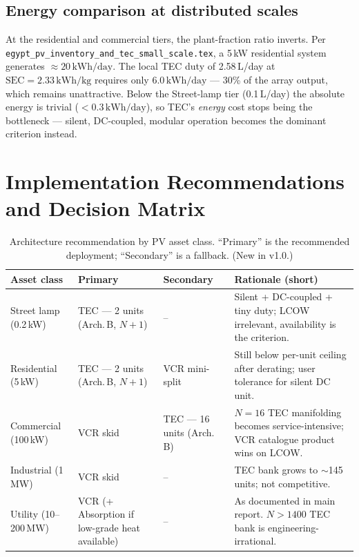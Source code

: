 \documentclass[11pt,a4paper]{article}
\newcommand{\SI}[2]{#1\,\ensuremath{\mathrm{#2}}}
\providecommand{\kilowatt}{kW}
\providecommand{\hour}{h}
\providecommand{\day}{day}
\providecommand{\kilogram}{kg}
\begin{document}
\subsection{Energy comparison at distributed scales}
At the residential and commercial tiers, the plant-fraction ratio inverts. Per \texttt{egypt\_pv\_inventory\_and\_tec\_small\_scale.tex}, a 5\,kW residential system generates $\approx\SI{20}{\kilowatt\hour/\day}$. The local TEC duty of 2.58\,L/day at $\mathrm{SEC}{=}\SI{2.33}{\kilowatt\hour/\kilogram}$ requires only $\SI{6.0}{\kilowatt\hour/\day}$ --- 30\% of the array output, which remains unattractive. Below the Street-lamp tier (0.1\,L/day) the absolute energy is trivial ($<\SI{0.3}{\kilowatt\hour/\day}$), so TEC's \emph{energy} cost stops being the bottleneck --- silent, DC-coupled, modular operation becomes the dominant criterion instead.

\section{Implementation Recommendations and Decision Matrix}
\label{sec:recommendations}

\begin{table}[h]
\centering\small
\caption{Architecture recommendation by PV asset class. ``Primary'' is the recommended deployment; ``Secondary'' is a fallback. (New in v1.0.)}
\label{tab:recommendations}
\begin{tabular}{@{}lllp{7cm}@{}}
\toprule
\textbf{Asset class} & \textbf{Primary} & \textbf{Secondary} & \textbf{Rationale (short)}\\
\midrule
Street lamp (0.2\,kW) & TEC --- 2 units (Arch.\,B, $N{+}1$) & -- & Silent + DC-coupled + tiny duty; LCOW irrelevant, availability is the criterion.\\
Residential (5\,kW)   & TEC --- 2 units (Arch.\,B, $N{+}1$) & VCR mini-split & Still below per-unit ceiling after derating; user tolerance for silent DC unit.\\
Commercial (100\,kW)  & VCR skid                              & TEC --- 16 units (Arch.\,B) & $N{=}16$ TEC manifolding becomes service-intensive; VCR catalogue product wins on LCOW.\\
Industrial (1\,MW)    & VCR skid                              & -- & TEC bank grows to $\sim$145 units; not competitive.\\
Utility (10--200\,MW) & VCR (+ Absorption if low-grade heat available) & -- & As documented in main report. $N{>}1400$ TEC bank is engineering-irrational.\\
\bottomrule
\end{tabular}
\end{table}
\end{document}

